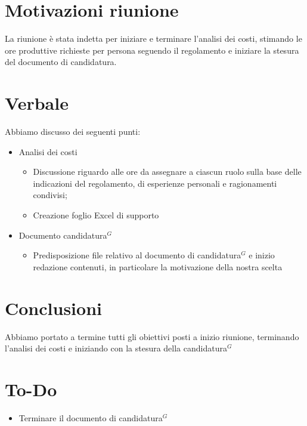 \documentclass[a4paper,10pt]{article}
\begin{document}
\section*{Motivazioni riunione}
La riunione è stata indetta per iniziare e terminare l'analisi dei costi, stimando le ore produttive richieste per persona seguendo il regolamento e iniziare la stesura del documento di candidatura.

\newpage

\section*{Verbale}
Abbiamo discusso dei seguenti punti:
\begin{itemize}
    \item Analisi dei costi
    \begin{itemize}
        \item Discussione riguardo alle ore da assegnare a ciascun ruolo sulla base delle indicazioni del regolamento, di esperienze personali e ragionamenti condivisi;
        \item Creazione foglio Excel di supporto 
    \end{itemize}
    \item Documento candidatura$^G$
    \begin{itemize}
        \item 	Predisposizione file relativo al documento di candidatura$^G$ e  inizio redazione contenuti, in particolare la motivazione della nostra scelta
    \end{itemize}
\end{itemize}

\section*{Conclusioni}
Abbiamo portato a termine tutti gli obiettivi posti a inizio riunione, terminando l'analisi dei costi e iniziando con la stesura della candidatura$^G$

\section*{To-Do}
\begin{itemize}
    \par
    \item Terminare il documento di candidatura$^G$
\end{itemize}
\end{document}
